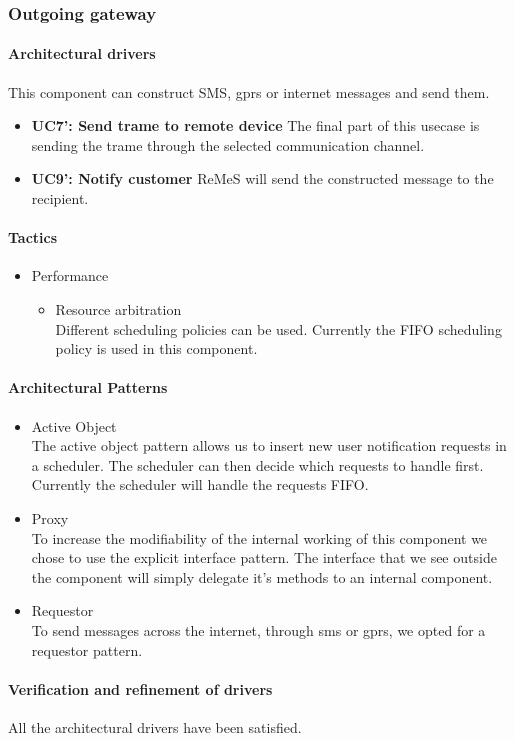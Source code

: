 \subsubsection{Outgoing gateway}
\paragraph{Architectural drivers}
This component can construct SMS, gprs or internet messages and send them.
\begin{itemize}
	\item \textbf{UC7': Send trame to remote device}
	The final part of this usecase is sending the trame through the selected
		communication channel.
	\item \textbf{UC9': Notify customer}
	ReMeS will send the constructed message to the recipient.
\end{itemize}


\paragraph{Tactics}
\begin{itemize}
	\item Performance
	\begin{itemize}
		\item Resource arbitration\\
		Different scheduling policies can be used. Currently the FIFO scheduling policy is used in this component.
	\end{itemize}
\end{itemize}


\paragraph{Architectural Patterns}
\begin{itemize}
	\item Active Object \\
	The active object pattern allows us to insert new user notification requests in a scheduler. The scheduler can
		then decide which requests to handle first.  Currently the scheduler will handle
		the requests FIFO.
	\item Proxy \\
	To increase the modifiability of the internal working of this component we chose
		to use the explicit interface pattern. The interface that we see outside the
		component will simply delegate it's methods to an internal component.
	\item Requestor \\
	To send messages across the internet, through sms or gprs, we opted for a
		requestor pattern.
\end{itemize}


\paragraph{Verification and refinement of drivers}
All the architectural drivers have been satisfied.
